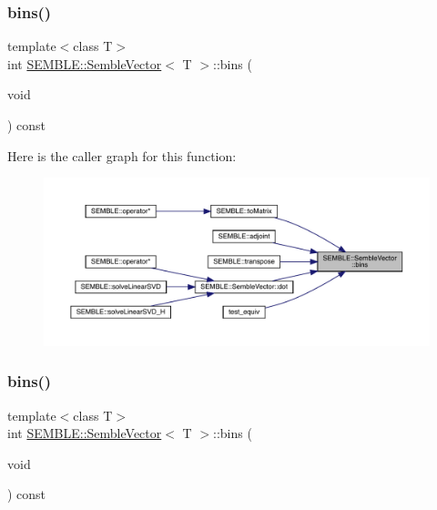 \subsubsection{\texorpdfstring{bins()}{bins()}\hspace{0.1cm}{\footnotesize\ttfamily [1/4]}}
{\footnotesize\ttfamily template$<$class T$>$ \\
int \mbox{\hyperlink{structSEMBLE_1_1SembleVector}{S\+E\+M\+B\+L\+E\+::\+Semble\+Vector}}$<$ T $>$\+::bins (\begin{DoxyParamCaption}\item[{void}]{ }\end{DoxyParamCaption}) const\hspace{0.3cm}{\ttfamily [inline]}}

Here is the caller graph for this function\+:
\nopagebreak
\begin{figure}[H]
\begin{center}
\leavevmode
\includegraphics[width=350pt]{d9/d94/structSEMBLE_1_1SembleVector_a5820189cbbd205f6a7e134c0879b993b_icgraph}
\end{center}
\end{figure}
\mbox{\label{structSEMBLE_1_1SembleVector_a5820189cbbd205f6a7e134c0879b993b}} 
\subsubsection{\texorpdfstring{bins()}{bins()}\hspace{0.1cm}{\footnotesize\ttfamily [2/4]}}
{\footnotesize\ttfamily template$<$class T$>$ \\
int \mbox{\hyperlink{structSEMBLE_1_1SembleVector}{S\+E\+M\+B\+L\+E\+::\+Semble\+Vector}}$<$ T $>$\+::bins (\begin{DoxyParamCaption}\item[{void}]{ }\end{DoxyParamCaption}) const\hspace{0.3cm}{\ttfamily [inline]}}

